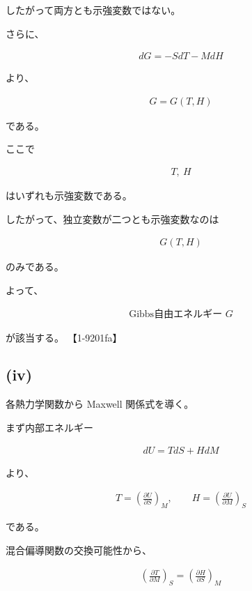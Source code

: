 \documentclass[platex,dvipdfmx,a4paper]{jsarticle}
\begin{document}
したがって両方とも示強変数ではない。

さらに、

\begin{align*}
dG
=
-SdT-MdH
\end{align*}

より、

\begin{align*}
G=G(T,H)
\end{align*}

である。

ここで

\begin{align*}
T,\ H
\end{align*}

はいずれも示強変数である。

したがって、独立変数が二つとも示強変数なのは

\begin{align*}
G(T,H)
\end{align*}

のみである。

よって、

\begin{align*}
\boxed{\text{Gibbs自由エネルギー }G}
\end{align*}

が該当する。 【1-9201fa】

\subsection{(iv)}

各熱力学関数から Maxwell 関係式を導く。

まず内部エネルギー

\begin{align*}
dU
=
TdS+HdM
\end{align*}

より、

\begin{align*}
T
=
\left(
\frac{\partial U}{\partial S}
\right)_M,
\qquad
H
=
\left(
\frac{\partial U}{\partial M}
\right)_S
\end{align*}

である。

混合偏導関数の交換可能性から、

\begin{align*}
\left(
\frac{\partial T}{\partial M}
\right)_S
=
\left(
\frac{\partial H}{\partial S}
\right)_M
\end{align*}
\end{document}
